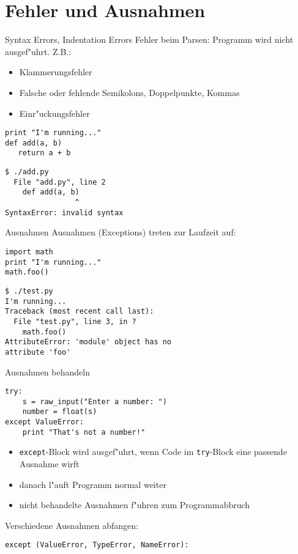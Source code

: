\section{Fehler und Ausnahmen}

\begin{frame}[fragile]{Syntax Errors, Indentation Errors}
Fehler beim Parsen: \alert{Programm wird nicht ausgef"uhrt}. Z.B.: 
\begin{itemize}
\item Klammerungsfehler
\item Falsche oder fehlende Semikolons, Doppelpunkte, Kommas
\item Einr"uckungsfehler
\end{itemize}
\begin{lstlisting}[style=Python]
print "I'm running..."
def add(a, b)
   return a + b
\end{lstlisting}
\begin{lstlisting}[style=Shell]
$ ./add.py
  File "add.py", line 2
    def add(a, b)
                ^
SyntaxError: invalid syntax
\end{lstlisting} %
\end{frame}

\begin{frame}[fragile]{Ausnahmen}
Ausnahmen (Exceptions) treten \alert{zur Laufzeit} auf:
\begin{lstlisting}[style=Python]
import math
print "I'm running..."
math.foo()
\end{lstlisting}
\begin{lstlisting}[style=Shell]
$ ./test.py
I'm running...
Traceback (most recent call last):
  File "test.py", line 3, in ?
    math.foo()
AttributeError: 'module' object has no 
attribute 'foo'
\end{lstlisting} %
\end{frame}

\begin{frame}[fragile]{Ausnahmen behandeln}
\begin{lstlisting}[style=Python]
try:
    s = raw_input("Enter a number: ")
    number = float(s)
except ValueError:
    print "That's not a number!"
\end{lstlisting}
\begin{itemize}
\item \lstinline{except}-Block wird ausgef"uhrt, wenn Code im \lstinline{try}-Block eine passende Ausnahme wirft
\item danach l"auft Programm normal weiter
\item nicht behandelte Ausnahmen f"uhren zum Programmabbruch
\end{itemize}
Verschiedene Ausnahmen abfangen:
\begin{lstlisting}[style=Python]
except (ValueError, TypeError, NameError):
\end{lstlisting}
\end{frame}


